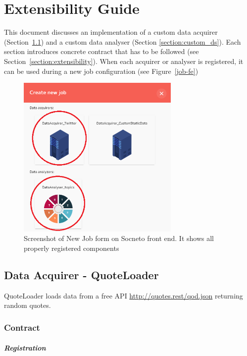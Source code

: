 \chapter{Extensibility Guide}\label{chapter:extensibility}

This document discusses an implementation of a custom data acquirer (Section~\ref{section:custom_da}) and a custom data analyser (Section \ref{section:custom_ds}). Each section introduces concrete contract that has to be followed (see Section~\ref{section:extensibility}). When each acquirer or analyser is registered, it can be used during a new job configuration (see Figure~\ref{job-fe})

\begin{figure}[H]\label{job-fe}
\centering
\includegraphics[width=0.7\textwidth]{diagrams/fe-job.png}
\caption{Screenshot of New Job form on Socneto front end. It shows all properly registered components}
\label{figure:monitoring-diagram}
\end{figure}

\section{Data Acquirer - QuoteLoader}\label{section:custom_da}

QuoteLoader loads data from a free API \url{http://quotes.rest/qod.json} returning random quotes.

\subsection{Contract}

\paragraph{Registration}

